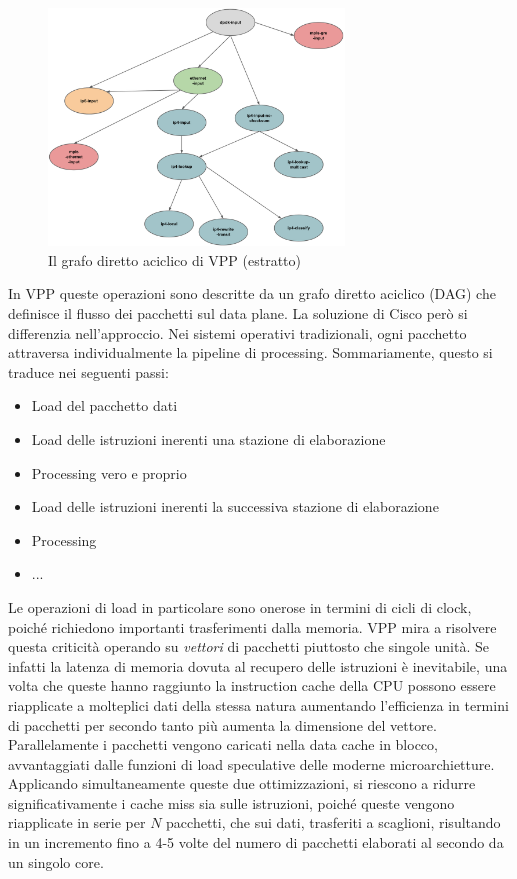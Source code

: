 \begin{figure}[htb]
    \includegraphics[width=0.7\textwidth]{graphics/vpp-dag.png}
    \caption{Il grafo diretto aciclico di VPP (estratto) \cite{vpp-overview}}
    \label{fig:vpp-dag}
\end{figure}

In VPP queste operazioni sono descritte da un grafo diretto aciclico (DAG) che definisce il flusso dei pacchetti sul data plane. La soluzione di Cisco però si differenzia nell'approccio. Nei sistemi operativi tradizionali, ogni pacchetto attraversa individualmente la pipeline di processing. Sommariamente, questo si traduce nei seguenti passi:

\begin{itemize}
    \item Load del pacchetto dati
    \item Load delle istruzioni inerenti una stazione di elaborazione
    \item Processing vero e proprio
    \item Load delle istruzioni inerenti la successiva stazione di elaborazione
    \item Processing
    \item ...
\end{itemize}

Le operazioni di load in particolare sono onerose in termini di cicli di clock, poiché richiedono importanti trasferimenti dalla memoria. VPP mira a risolvere questa criticità operando su \textit{vettori} di pacchetti piuttosto che singole unità. Se infatti la latenza di memoria dovuta al recupero delle istruzioni è inevitabile, una volta che queste hanno raggiunto la instruction cache della CPU possono essere riapplicate a molteplici dati della stessa natura aumentando l'efficienza in termini di pacchetti per secondo tanto più aumenta la dimensione del vettore. Parallelamente i pacchetti vengono caricati nella data cache in blocco, avvantaggiati dalle funzioni di load speculative delle moderne microarchietture. Applicando simultaneamente queste due ottimizzazioni, si riescono a ridurre significativamente i cache miss sia sulle istruzioni, poiché queste vengono riapplicate in serie per $N$ pacchetti, che sui dati, trasferiti a scaglioni, risultando in un incremento fino a 4-5 volte del numero di pacchetti elaborati al secondo da un singolo core.


